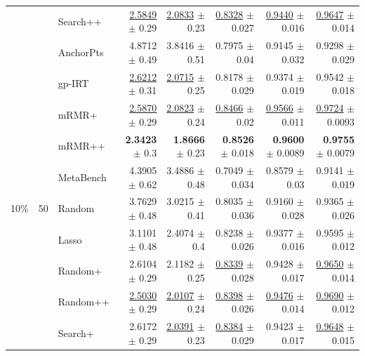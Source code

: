 \begin{longtable}{llp{}rrrrr}
 &  & Search++ & \underline{2.5849} {\scriptsize $\pm$ 0.29} & \underline{2.0833} {\scriptsize $\pm$ 0.23} & \underline{0.8328} {\scriptsize $\pm$ 0.027} & \underline{0.9440} {\scriptsize $\pm$ 0.016} & \underline{0.9647} {\scriptsize $\pm$ 0.014} \\
 &  & AnchorPts & 4.8712 {\scriptsize $\pm$ 0.49} & 3.8416 {\scriptsize $\pm$ 0.51} & 0.7975 {\scriptsize $\pm$ 0.04} & 0.9145 {\scriptsize $\pm$ 0.032} & 0.9298 {\scriptsize $\pm$ 0.029} \\
 &  & gp-IRT & \underline{2.6212} {\scriptsize $\pm$ 0.31} & \underline{2.0715} {\scriptsize $\pm$ 0.25} & 0.8178 {\scriptsize $\pm$ 0.029} & 0.9374 {\scriptsize $\pm$ 0.019} & 0.9542 {\scriptsize $\pm$ 0.018} \\
 &  & mRMR+ & \underline{2.5870} {\scriptsize $\pm$ 0.29} & \underline{2.0823} {\scriptsize $\pm$ 0.24} & \underline{0.8466} {\scriptsize $\pm$ 0.02} & \underline{0.9566} {\scriptsize $\pm$ 0.011} & \underline{0.9724} {\scriptsize $\pm$ 0.0093} \\
 &  & mRMR++ & \textbf{2.3423} {\scriptsize $\pm$ 0.3} & \textbf{1.8666} {\scriptsize $\pm$ 0.23} & \textbf{0.8526} {\scriptsize $\pm$ 0.018} & \textbf{0.9600} {\scriptsize $\pm$ 0.0089} & \textbf{0.9755} {\scriptsize $\pm$ 0.0079} \\
 &  & MetaBench & 4.3905 {\scriptsize $\pm$ 0.62} & 3.4886 {\scriptsize $\pm$ 0.48} & 0.7049 {\scriptsize $\pm$ 0.034} & 0.8579 {\scriptsize $\pm$ 0.03} & 0.9141 {\scriptsize $\pm$ 0.019} \\
\midrule
10\% & 50 & Random & 3.7629 {\scriptsize $\pm$ 0.48} & 3.0215 {\scriptsize $\pm$ 0.41} & 0.8035 {\scriptsize $\pm$ 0.036} & 0.9160 {\scriptsize $\pm$ 0.028} & 0.9365 {\scriptsize $\pm$ 0.026} \\
 &  & Lasso & 3.1101 {\scriptsize $\pm$ 0.48} & 2.4074 {\scriptsize $\pm$ 0.4} & 0.8238 {\scriptsize $\pm$ 0.026} & 0.9377 {\scriptsize $\pm$ 0.016} & 0.9595 {\scriptsize $\pm$ 0.012} \\
 &  & Random+ & 2.6104 {\scriptsize $\pm$ 0.29} & 2.1182 {\scriptsize $\pm$ 0.25} & \underline{0.8339} {\scriptsize $\pm$ 0.028} & 0.9428 {\scriptsize $\pm$ 0.017} & \underline{0.9650} {\scriptsize $\pm$ 0.014} \\
 &  & Random++ & \underline{2.5030} {\scriptsize $\pm$ 0.29} & \underline{2.0107} {\scriptsize $\pm$ 0.24} & \underline{0.8398} {\scriptsize $\pm$ 0.026} & \underline{0.9476} {\scriptsize $\pm$ 0.014} & \underline{0.9690} {\scriptsize $\pm$ 0.012} \\
 &  & Search+ & 2.6172 {\scriptsize $\pm$ 0.29} & \underline{2.0391} {\scriptsize $\pm$ 0.23} & \underline{0.8384} {\scriptsize $\pm$ 0.029} & 0.9423 {\scriptsize $\pm$ 0.017} & \underline{0.9648} {\scriptsize $\pm$ 0.015} \\

\end{longtable}
